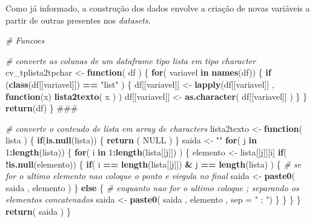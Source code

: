 \documentclass[]{article}
\newenvironment{Shaded}{\begin{snugshade}}{\end{snugshade}}
\newcommand{\KeywordTok}[1]{\textcolor[rgb]{0.13,0.29,0.53}{\textbf{#1}}}
\newcommand{\DataTypeTok}[1]{\textcolor[rgb]{0.13,0.29,0.53}{#1}}
\newcommand{\DecValTok}[1]{\textcolor[rgb]{0.00,0.00,0.81}{#1}}
\newcommand{\StringTok}[1]{\textcolor[rgb]{0.31,0.60,0.02}{#1}}
\newcommand{\CommentTok}[1]{\textcolor[rgb]{0.56,0.35,0.01}{\textit{#1}}}
\newcommand{\OtherTok}[1]{\textcolor[rgb]{0.56,0.35,0.01}{#1}}
\newcommand{\ControlFlowTok}[1]{\textcolor[rgb]{0.13,0.29,0.53}{\textbf{#1}}}
\newcommand{\OperatorTok}[1]{\textcolor[rgb]{0.81,0.36,0.00}{\textbf{#1}}}
\newcommand{\NormalTok}[1]{#1}
\begin{document}
Como já informado, a construção dos dados envolve a criação de novas
variáveis a partir de outras presentes nos \emph{datasets}.

\begin{Shaded}
\begin{Highlighting}[]
\CommentTok{# Funcoes }

\CommentTok{# converte as colunas de um dataframe tipo lista em tipo character}
\NormalTok{cv_tplista2tpchar <-}\StringTok{ }\ControlFlowTok{function}\NormalTok{( df  ) \{ }
  \ControlFlowTok{for}\NormalTok{( variavel }\ControlFlowTok{in} \KeywordTok{names}\NormalTok{(df)) \{}
    \ControlFlowTok{if}\NormalTok{ (}\KeywordTok{class}\NormalTok{(df[[variavel]]) }\OperatorTok{==}\StringTok{ "list"}\NormalTok{ ) \{}
\NormalTok{      df[[variavel]] <-}\StringTok{ }\KeywordTok{lapply}\NormalTok{(df[[variavel]] ,   }\ControlFlowTok{function}\NormalTok{(x)   }\KeywordTok{lista2texto}\NormalTok{( x  ) ) }
\NormalTok{      df[[variavel]] <-}\StringTok{ }\KeywordTok{as.character}\NormalTok{( df[[variavel]] )}
\NormalTok{    \}}
\NormalTok{  \}}
  \KeywordTok{return}\NormalTok{(df)}
\NormalTok{\}}
\NormalTok{###}


\CommentTok{# converte o conteudo de lista em array de characters}
\NormalTok{lista2texto <-}\StringTok{ }\ControlFlowTok{function}\NormalTok{( lista  ) \{}
  \ControlFlowTok{if}\NormalTok{(}\KeywordTok{is.null}\NormalTok{(lista)) \{}
    \KeywordTok{return}\NormalTok{ ( }\OtherTok{NULL}\NormalTok{ )}
\NormalTok{  \}}
\NormalTok{  saida <-}\StringTok{ ""}
  \ControlFlowTok{for}\NormalTok{( j }\ControlFlowTok{in} \DecValTok{1}\OperatorTok{:}\KeywordTok{length}\NormalTok{(lista)) \{ }
    \ControlFlowTok{for}\NormalTok{( i }\ControlFlowTok{in} \DecValTok{1}\OperatorTok{:}\KeywordTok{length}\NormalTok{(lista[[j]]) ) \{}
\NormalTok{      elemento <-}\StringTok{ }\NormalTok{lista[[j]][i] }
      \ControlFlowTok{if}\NormalTok{( }\OperatorTok{!}\KeywordTok{is.null}\NormalTok{(elemento)) \{ }
        \ControlFlowTok{if}\NormalTok{( i }\OperatorTok{==}\StringTok{ }\KeywordTok{length}\NormalTok{(lista[[j]]) }\OperatorTok{&}\StringTok{ }\NormalTok{j }\OperatorTok{==}\StringTok{ }\KeywordTok{length}\NormalTok{(lista)  ) \{ }
          \CommentTok{# se for o ultimo elemento nao coloque o ponto e virgula no final            }
\NormalTok{          saida <-}\StringTok{ }\KeywordTok{paste0}\NormalTok{( saida , elemento  )}
\NormalTok{        \} }\ControlFlowTok{else}\NormalTok{ \{}
          \CommentTok{# enquanto nao for o ultimo coloque ; separando os elementos concatenados }
\NormalTok{          saida <-}\StringTok{ }\KeywordTok{paste0}\NormalTok{( saida , elemento , }\DataTypeTok{sep =} \StringTok{" ; "}\NormalTok{)}
\NormalTok{        \}}
\NormalTok{      \}  }
\NormalTok{    \}}
\NormalTok{  \}}
  \KeywordTok{return}\NormalTok{( saida )}
\NormalTok{\}}


\end{Highlighting}
\end{Shaded}
\end{document}
